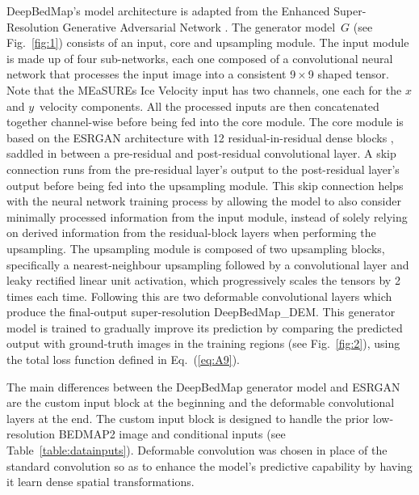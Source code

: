 \documentclass[tc, noline]{copernicus}
\begin{document}
DeepBedMap's model architecture is adapted from the Enhanced Super-Resolution Generative Adversarial Network
\citep[ESRGAN;][]{WangESRGANEnhancedSuperResolution2019}.
The generator model~$G$ (see Fig.~\ref{fig:1}) consists of an input, core and upsampling module.
The input module is made up of four sub-networks, each one composed of a convolutional neural network that processes the input image into a consistent 9\,$\times$\,9 shaped tensor.
Note that the MEaSUREs Ice Velocity \citep{MouginotMEaSUREsPhaseMap2019} input has two channels, one each for the $x$ and $y$~velocity components.
All the processed inputs are then concatenated together channel-wise before being fed into the core module.
The core module is based on the ESRGAN architecture with 12 residual-in-residual dense blocks \citep[see][for details]{WangESRGANEnhancedSuperResolution2019}, saddled in between a pre-residual and post-residual convolutional layer.
A skip connection runs from the pre-residual layer's output to the post-residual layer's output before being fed into the upsampling module.
This skip connection \citep{HeIdentityMappingsDeep2016} helps with the neural network training process by allowing the model to also consider minimally processed information from the input module, instead of solely relying on derived information from the residual-block layers when performing the upsampling.
The upsampling module is composed of two upsampling blocks, specifically a nearest-neighbour upsampling followed by a convolutional layer and leaky rectified linear unit \citep[LeakyReLU;][]{MaasRectifiernonlinearitiesimprove2013} activation, which progressively scales the tensors by 2 times each time.
Following this are two deformable convolutional layers \citep{DaiDeformableConvolutionalNetworks2017} which produce the final-output super-resolution DeepBedMap\_DEM.
This generator model is trained to gradually improve its prediction by comparing the predicted output with ground-truth images in the training regions (see Fig.~\ref{fig:2}), using the total loss function defined in Eq.~(\ref{eq:A9}).

The main differences between the DeepBedMap generator model and ESRGAN are the custom input block at the beginning and the deformable convolutional layers at the end.
The custom input block is designed to handle the prior low-resolution BEDMAP2 image and conditional inputs (see Table~\ref{table:datainputs}).
Deformable convolution was chosen in place of the standard convolution so as to enhance the model's predictive capability by having it learn dense spatial transformations.
\end{document}
